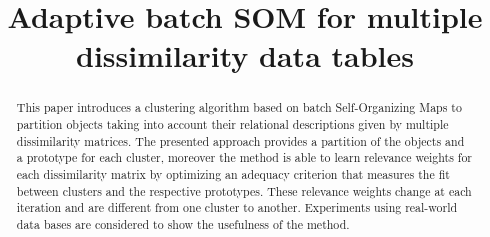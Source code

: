 \documentclass[10pt, conference, compsocconf]{IEEEtran}
\begin{document}
%
\title{Adaptive batch SOM for multiple dissimilarity data tables}





% 
\author{

}


\maketitle


\begin{abstract}
This paper introduces a clustering algorithm based on batch Self-Organizing Maps to partition objects taking into account their relational descriptions given by multiple dissimilarity matrices. 
The presented approach provides a partition of the objects and a prototype for each cluster, moreover the method is able to learn relevance weights for each dissimilarity matrix by optimizing an adequacy criterion that measures the fit between clusters and the respective prototypes. These relevance weights change at each iteration and are different from one cluster to another. Experiments using real-world data bases are considered to show the usefulness of the method.

\end{abstract}
\end{document}
